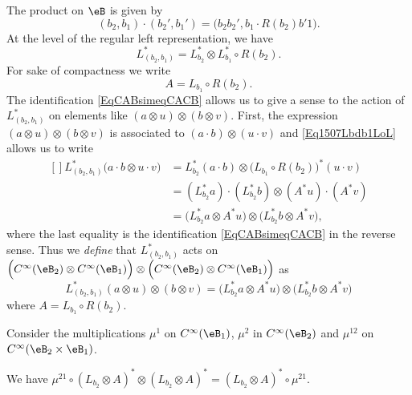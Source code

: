 The product on $\eB$ is given by
\begin{equation}
	(b_2,b_1)\cdot (b_2',b_1')=\big( b_2b_2',b_1\cdot R(b_2)b'1 \big).
\end{equation}
At the level of the regular left representation, we have
\begin{equation}	\label{Eq1507Lbdb1LoL}
	L^*_{(b_2,b_1)}=L^*_{b_2}\otimes L^*_{b_1}\circ R(b_2).
\end{equation}
For sake of compactness we write
\begin{equation}
	A=L_{b_1}\circ R(b_2).
\end{equation}
The identification \eqref{EqCABsimeqCACB} allows us to give a sense to the action of $L^*_{(b_2,b_1)}$ on elements like $(a\otimes u)\otimes(b\otimes v)$. First, the expression $(a\otimes u)\otimes(b\otimes v)$ is associated to $(a\cdot b)\otimes(u\cdot v)$ and \eqref{Eq1507Lbdb1LoL} allows us to write
\begin{equation}
	\begin{aligned}[]
		L^*_{(b_2,b_1)}\big( a\cdot b\otimes u\cdot v \big)&=L^*_{b_2}(a\cdot b)\otimes \big( L_{b_1}\circ R(b_2) \big)^*(u\cdot v)\\
		&=(L^*_{b_2}a)\cdot(L^*_{b_2}b)\otimes (A^*u)\cdot (A^*v)\\
		&=\big( L^*_{b_2}a\otimes A^*u \big)\otimes\big( L^*_{b_2}b\otimes A^*v \big),
	\end{aligned}
\end{equation}
where the last equality is the identification \eqref{EqCABsimeqCACB} in the reverse sense. Thus we \emph{define} that $L^*_{(b_2,b_1)}$ acts on $\Big(  C^{\infty}(\eB_2)\otimes C^{\infty}(\eB_1) \Big)\otimes\Big(  C^{\infty}(\eB_2)\otimes C^{\infty}(\eB_1) \Big)$ as
\begin{equation}		\label{Eq1507LsurBBBB}
	L^*_{(b_2,b_1)}(a\otimes u)\otimes(b\otimes v)=\big( L^*_{b_2}a\otimes A^*u \big)\otimes\big( L^*_{b_2}b\otimes A^*v \big)
\end{equation}
where $A=L_{b_1}\circ R(b_2)$.

Consider the multiplications $\mu^1$ on $ C^{\infty}(\eB_1)$, $\mu^2$ in $ C^{\infty}(\eB_2)$ and $\mu^{12}$ on $ C^{\infty}(\eB_2\times \eB_1)$.

\begin{lemma}		\label{Lem1607mualalmu}
	We have $\mu^{21}\circ(L_{b_2}\otimes A)^*\otimes(L_{b_2}\otimes A)^*=(L_{b_2}\otimes A)^*\circ\mu^{21}$.
\end{lemma}

